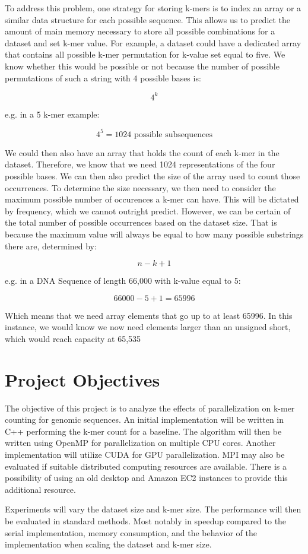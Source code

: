 \documentclass{article}
\begin{document}
\vspace{\baselineskip}

To address this problem, one strategy for storing k-mers is to index an array or a similar data structure for each possible sequence. 
This allows us to predict the amount of main memory necessary to store all possible combinations for a dataset and set k-mer value.  
For example, a dataset could have a dedicated array that contains all possible k-mer permutation for k-value set equal to five.  
We know whether this would be possible or not because the number of possible permutations of such a string with 4  
possible bases is:
 
\[
4^k
\]

e.g. in a 5 k-mer example:

\[
4^5 = 1024 \text{ possible subsequences}
\]

We could then also have an array that holds the count of each k-mer in the dataset. Therefore, we know that we  
need 1024 representations of the four possible bases. We can then also predict the size of the array used to count those  
occurrences. To determine the size necessary, we then need to consider the maximum possible number of occurences  
a k-mer can have. This will be dictated by frequency, which we cannot outright predict. However, we  
can be certain of the total number of possible occurrences based on the dataset size. That is because the maximum  
value will always be equal to how many possible substrings there are, determined by:

\[
n - k + 1
\]

e.g. in a DNA Sequence of length 66,000 with k-value equal to 5:

\[
66000 - 5 + 1 = 65996
\]

Which means that we need array elements that go up to at least 65996. In this instance, we would know we now need  
elements larger than an unsigned short, which would reach capacity at 65,535

\section{Project Objectives}

The objective of this project is to analyze the effects of parallelization on k-mer counting for genomic sequences.  
An initial implementation will be written in C++ performing the k-mer count for a baseline. The algorithm will then  
be written using OpenMP for parallelization on multiple CPU cores. Another implementation will utilize CUDA  
for GPU parallelization. MPI may also be evaluated if suitable distributed computing resources are available.  
There is a possibility of using an old desktop and Amazon EC2 instances to provide this additional resource. 
  
Experiments will vary the dataset size and k-mer size. The performance will then be evaluated in standard methods. Most  
notably in speedup compared to the serial implementation, memory consumption, and the behavior of the implementation when scaling  
the dataset and k-mer size. 


\newpage



\end{document}
